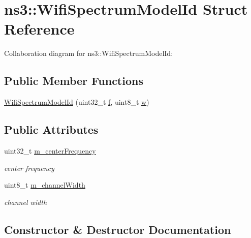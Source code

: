 \hypertarget{structns3_1_1WifiSpectrumModelId}{}\section{ns3\+:\+:Wifi\+Spectrum\+Model\+Id Struct Reference}
\label{structns3_1_1WifiSpectrumModelId}


Collaboration diagram for ns3\+:\+:Wifi\+Spectrum\+Model\+Id\+:
\subsection*{Public Member Functions}
\begin{DoxyCompactItemize}
\item 
\hyperlink{structns3_1_1WifiSpectrumModelId_a7bc98b6cc0d0cd58e9de1dfc66f69bf3}{Wifi\+Spectrum\+Model\+Id} (uint32\+\_\+t \hyperlink{80211b_8c_ae7ffc1a8f84fa47a0812b2f2b9627132}{f}, uint8\+\_\+t \hyperlink{mmwave_2model_2fading-traces_2fading__trace__generator_8m_afd61ec66f9d7b807eece6eb12c781844}{w})
\end{DoxyCompactItemize}
\subsection*{Public Attributes}
\begin{DoxyCompactItemize}
\item 
uint32\+\_\+t \hyperlink{structns3_1_1WifiSpectrumModelId_a15705ecab0f309e321b566024d4d6e41}{m\+\_\+center\+Frequency}
\begin{DoxyCompactList}\small\item\em center frequency \end{DoxyCompactList}\item 
uint8\+\_\+t \hyperlink{structns3_1_1WifiSpectrumModelId_aecc22379b273cab991dc34387fa00ab7}{m\+\_\+channel\+Width}
\begin{DoxyCompactList}\small\item\em channel width \end{DoxyCompactList}\end{DoxyCompactItemize}


\subsection{Constructor \& Destructor Documentation}
